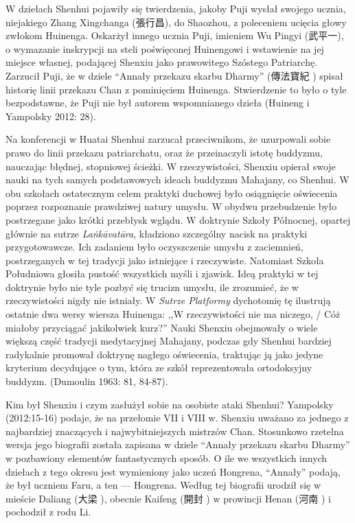 W dziełach Shenhui pojawiły się twierdzenia, jakoby Puji wysłał swojego ucznia, niejakiego Zhang Xingchanga (張行昌), do Shaozhou, z poleceniem ucięcia głowy zwłokom Huinenga.
Oskarżył innego ucznia Puji, imieniem Wu Pingyi (武平一), o wymazanie inskrypcji na steli poświęconej Huinengowi i wstawienie na jej miejsce własnej, podającej Shenxiu jako prawowitego Szóstego Patriarchę.
Zarzucił Puji, że w dziele ``Annały przekazu skarbu Dharmy'' (傳法寶紀 ) spisał historię linii przekazu Chan z pominięciem Huinenga.
Stwierdzenie to było o tyle bezpodstawne, że Puji nie był autorem wspomnianego dzieła
(Huineng i Yampolsky 2012: 28).

Na konferencji w Huatai Shenhui zarzucał przeciwnikom, że uzurpowali sobie prawo do linii przekazu patriarchatu, oraz że przeinaczyli istotę buddyzmu, nauczając błędnej, stopniowej ścieżki.
W rzeczywistości, Shenxiu opierał swoje nauki na tych samych podstawowych ideach buddyzmu Mahajany, co Shenhui.
W obu szkołach ostatecznym celem praktyki duchowej było osiągnięcie oświecenia poprzez rozpoznanie prawdziwej natury umysłu.
W obydwu przebudzenie było postrzegane jako krótki przebłysk wglądu.
W doktrynie Szkoły Północnej, opartej głównie na sutrze \textit{La\.nkā\-vatāra}, kładziono szczególny nacisk na praktyki przygotowawcze.
Ich zadaniem było oczyszczenie umysłu z zaciemnień, postrzeganych w tej tradycji jako istniejące i rzeczywiste.
Natomiast Szkoła Południowa głosiła pustość wszystkich myśli i zjawisk.
Ideą praktyki w tej doktrynie było nie tyle pozbyć się trucizn umysłu, ile zrozumieć, że w rzeczywistości nigdy nie istniały.
W \textit{Sutrze Platformy} dychotomię tę ilustrują ostatnie dwa wersy wiersza Huinenga: ,,W rzeczywistości nie ma niczego, / Cóż miałoby przyciągać jakikolwiek kurz?'' %
Nauki Shenxiu obejmowały o wiele większą część tradycji medytacyjnej Mahajany, podczas gdy Shenhui bardziej radykalnie promował doktrynę nagłego oświecenia, traktując ją jako jedyne kryterium decydujące o tym, która ze szkół reprezentowała ortodoksyjny buddyzm.
(Dumoulin 1963: 81, 84-87). %

Kim był Shenxiu i czym zasłużył sobie na osobiste ataki Shenhui?
Yampolsky (2012:15-16) podaje, że na przełomie VII i VIII w. Shenxiu uważano za jednego z najbardziej znaczących i najwybitniejszych mistrzów Chan.
Stosunkowo rzetelna wersja jego biografii została zapisana w dziele ``Annały przekazu skarbu Dharmy'' w pozbawiony elementów fantastycznych sposób.
O ile we wszystkich innych dziełach z tego okresu jest wymieniony jako uczeń Hongrena, ``Annały'' podają, że był uczniem Faru, a ten --- Hongrena.
Według tej biografii urodził się w mieście Daliang (大梁 ), obecnie Kaifeng (開封 ) w prowincji Henan (河南 ) i pochodził z rodu Li.

